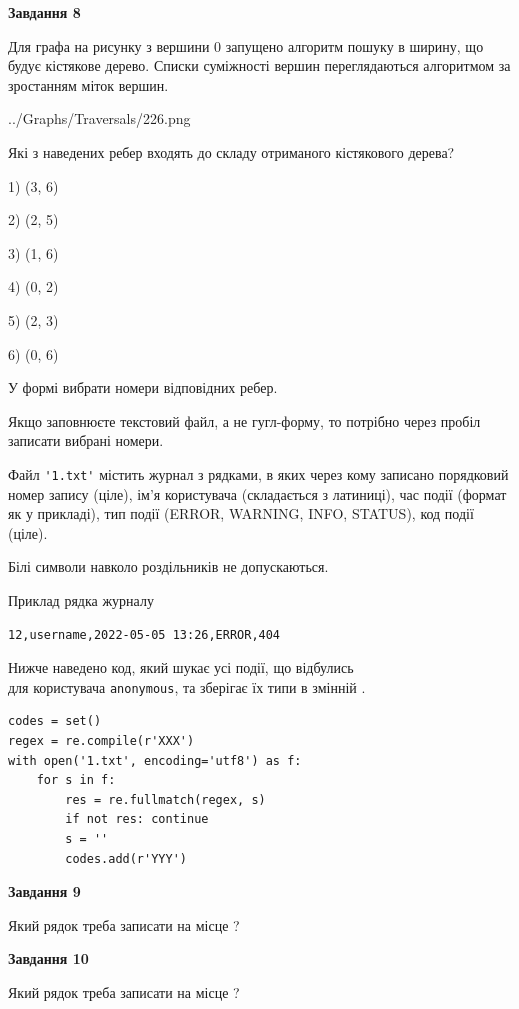 \documentclass[12pt, ukrainian]{article}
\def\code#1{\Verb!#1!}
\begin{document}
{\begin {large}
{\begin {center}\textbf{Завдання 8}\end {center}}\par
Для графа на рисунку з вершини 0 запущено алгоритм пошуку в ширину, що будує кістякове дерево. Списки суміжності вершин переглядаються алгоритмом за зростанням міток вершин.\par
\begin{center}
	{../Graphs/Traversals/226.png}
\end{center}
\par Які з наведених ребер входять до складу отриманого кістякового дерева?\par
1) (3, 6)\par
2) (2, 5)\par
3) (1, 6)\par
4) (0, 2)\par
5) (2, 3)\par
6) (0, 6)\par
{\vskip 15pt} У формі вибрати номери відповідних ребер.


Якщо заповнюєте текстовий файл, а не гугл-форму, то потрібно через пробіл записа\-ти вибрані номери.\par
\newpage


Файл \code{'1.txt'} містить журнал з рядками, в яких через кому записано поряд\-ко\-вий номер запису (ціле), ім'я користувача (складається з латиниці), час події (фор\-мат як у прикладі), тип події (ERROR, WARNING, INFO, STATUS), код події (ціле).

Білі символи навколо роздільників не допускаються.

Приклад рядка журналу



\begin{verbatim}
12,username,2022-05-05 13:26,ERROR,404
\end{verbatim}


Нижче наведено код, який шукає усі події, що відбулись\\ для користувача \code{anonymous}, та зберігає їх типи в змінній .



\begin{verbatim}
codes = set()
regex = re.compile(r'XXX')
with open('1.txt', encoding='utf8') as f:
    for s in f:
        res = re.fullmatch(regex, s)
        if not res: continue
        s = ''
        codes.add(r'YYY')
\end{verbatim}


{\begin {center}\textbf{Завдання 9}\end {center}}\par
Який рядок треба записати на місце  ?\par
\vspace{5mm}


{\begin {center}\textbf{Завдання 10}\end {center}}\par
Який рядок треба записати на місце  ?\par


\newpage


\end {large}}
\end{document}
